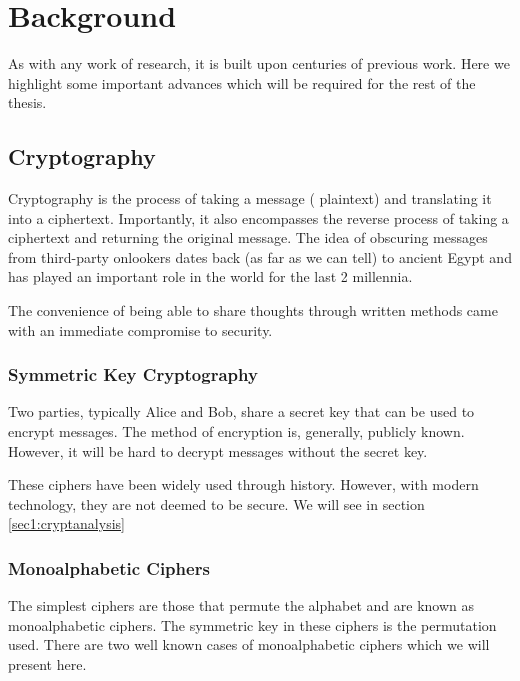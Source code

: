 %
%
\graphicspath{{./chapters/chapter02/fig02/}}

\let\textcircled=\pgftextcircled
\chapter{Background}
\label{chap:background}

As with any work of research, it is built upon centuries of previous work. Here we highlight some important advances which will be required for the rest of the thesis.

\section{Cryptography}
\label{sec1:crypto}

Cryptography is the process of taking a message ({\color{bristol-red} plaintext}) and translating it into a {\color{bristol-red} ciphertext}. Importantly, it also encompasses the reverse process of taking a ciphertext and returning the original message. The idea of obscuring messages from third-party onlookers dates back (as far as we can tell) to ancient Egypt and has played an important role in the world for the last 2 millennia. 

The convenience of being able to share thoughts through written methods came with an immediate compromise to security.

\subsection{Symmetric Key Cryptography}

Two parties, typically Alice and Bob, share a secret key that can be used to encrypt messages. The method of encryption is, generally, publicly known. However, it will be hard to decrypt messages without the secret key.

These ciphers have been widely used through history. However, with modern technology, they are not deemed to be secure. We will see in section \ref{sec1:cryptanalysis}

\subsection{Monoalphabetic Ciphers}

The simplest ciphers are those that permute the alphabet and are known as {\color{bristol-red} monoalphabetic ciphers}. The symmetric key in these ciphers is the permutation used. There are two well known cases of monoalphabetic ciphers which we will present here. 

